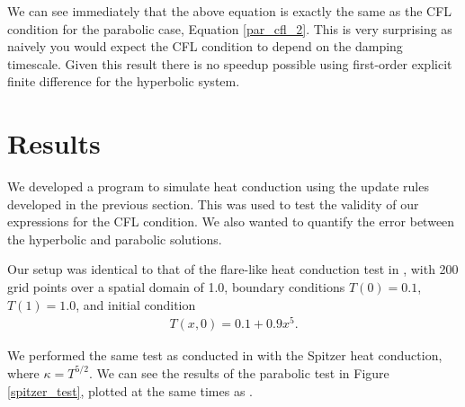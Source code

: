 \documentclass[iop]{emulateapj}
\begin{document}
				We can see immediately that the above equation is exactly the same as the CFL condition for the parabolic case, Equation \ref{par_cfl_2}.
				This is very surprising as naively you would expect the CFL condition to depend on the damping timescale.
				Given this result there is no speedup possible using first-order explicit finite difference for the hyperbolic system.
			
	\section{Results} \label{res_sec}
	
		We developed a program to simulate heat conduction using the update rules developed in the previous section.
			This was used to test the validity of our expressions for the CFL condition.
			We also wanted to quantify the error between the hyperbolic and parabolic solutions.
			
		Our setup was identical to that of the flare-like heat conduction test in , with 200 grid points over a spatial domain of 1.0, boundary conditions $T(0) = 0.1$, $T(1) = 1.0$, and initial condition
		\begin{align}
			T(x,0) = 0.1 + 0.9 x^5.
		\end{align} 
	
		We performed the same test as conducted in  with the Spitzer heat conduction, where $\kappa = T^{5/2}$.
			We can see the results of the parabolic test in Figure \ref{spitzer_test}, plotted at the same times as .

			
	
	
		
\end{document}
